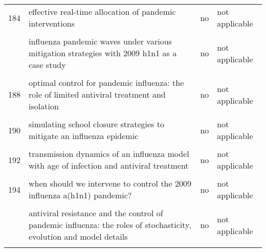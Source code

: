 \documentclass[
]{article}
\begin{document}
\begin{landscape}
\begin{longtable}{l>{\raggedright\arraybackslash}p{4cm}l>{\raggedright\arraybackslash}p{4cm}}
184 & effective real-time allocation of pandemic interventions & no & not applicable\\
\cellcolor{gray!6}{185} & \cellcolor{gray!6}{efficient mitigation strategies for epidemics in rural regions} & \cellcolor{gray!6}{no} & \cellcolor{gray!6}{not applicable}\\
\addlinespace
186 & influenza pandemic waves under various mitigation strategies with 2009 h1n1 as a case study & no & not applicable\\
\cellcolor{gray!6}{187} & \cellcolor{gray!6}{is a mass immunization program for pandemic (h1n1) 2009 good value for money? early evidence from the canadian experience} & \cellcolor{gray!6}{no} & \cellcolor{gray!6}{not applicable}\\
188 & optimal control for pandemic influenza: the role of limited antiviral treatment and isolation & no & not applicable\\
\cellcolor{gray!6}{189} & \cellcolor{gray!6}{optimizing vaccine allocation at different points in time during an epidemic} & \cellcolor{gray!6}{no} & \cellcolor{gray!6}{not applicable}\\
190 & simulating school closure strategies to mitigate an influenza epidemic & no & not applicable\\
\addlinespace
\cellcolor{gray!6}{191} & \cellcolor{gray!6}{the effect of mask use on the spread of influenza during a pandemic} & \cellcolor{gray!6}{no} & \cellcolor{gray!6}{not applicable}\\
192 & transmission dynamics of an influenza model with age of infection and antiviral treatment & no & not applicable\\
\cellcolor{gray!6}{193} & \cellcolor{gray!6}{transmission risks and control of foot-and-mouth disease in the netherlands: spatial patterns} & \cellcolor{gray!6}{no} & \cellcolor{gray!6}{not applicable}\\
194 & when should we intervene to control the 2009 influenza a(h1n1) pandemic? & no & not applicable\\
\cellcolor{gray!6}{195} & \cellcolor{gray!6}{adaptive vaccination strategies to mitigate pandemic influenza} & \cellcolor{gray!6}{no} & \cellcolor{gray!6}{not applicable}\\
\addlinespace
196 & antiviral resistance and the control of pandemic influenza: the roles of stochasticity, evolution and model details & no & not applicable\\
\cellcolor{gray!6}{197} & \cellcolor{gray!6}{economic evaluation of influenza pandemic mitigation strategies in the united states using a stochastic microsimulation transmission model} & \cellcolor{gray!6}{yes} & \cellcolor{gray!6}{no}\\

\end{longtable}
\end{landscape}
\end{document}
